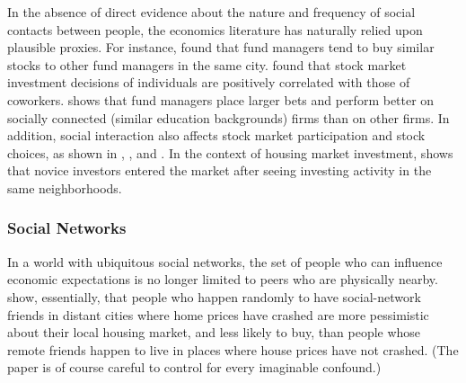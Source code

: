 In the absence of direct evidence about the nature and frequency of social contacts between people, the economics literature has naturally relied upon plausible proxies.   For instance,  \href{http://www.columbia.edu/~hh2679/ThyNeighborJF.pdf}{\cite{hong2005thy}} found that fund managers tend to buy similar stocks to other fund managers in the same city. \href{https://github.com/iworld1991/EpiExp/blob/master/Literature/hvide2015social.pdf}{\cite{hvide2015social}} found that stock market investment decisions of individuals are positively correlated with those of coworkers.  \href{https://www.jstor.org/stable/10.1086/592415}{\cite{cohen2008small}} shows that fund managers place larger bets and perform better on socially connected (similar education backgrounds) firms than on other firms.  In addition, social interaction also affects stock market participation and stock choices, as shown in  \href{https://github.com/iworld1991/EpiExp/blob/master/Literature/hong2004social.pdf}{\cite{hong2004social}}, \href{https://onlinelibrary.wiley.com/doi/abs/10.1111/j.1540-6261.2008.01364.x}{\cite{brown2008neighbors}}, and \href{https://github.com/iworld1991/EpiExp/blob/master/Literature/ivkovic2007information.pdf}{\cite{ivkovic2007information}}. %
 In the context of housing market investment,
 \href{https://www.aeaweb.org/articles?id=10.1257/aer.20171611&from=f}{\cite{bayer2021speculative}} shows that novice investors entered the market after seeing investing activity in the same neighborhoods.

\subsubsection{Social Networks}

In a world with ubiquitous social networks, the set of people who can influence economic expectations is no longer limited to peers who are physically nearby.  \href{https://www.journals.uchicago.edu/doi/abs/10.1086/700073}{\cite{bailey2018economic}} show, essentially, that people who happen randomly to have social-network friends in distant cities where home prices have crashed are more pessimistic about their local housing market, and less likely to buy, than people whose remote friends happen to live in places where house prices have not crashed.  (The paper is of course careful to control for every imaginable confound.)

